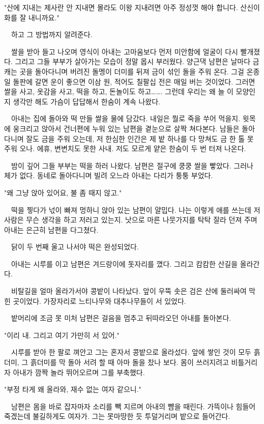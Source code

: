 \documentclass[fs9,seriesRus]{korfarm-base}
\begin{document}
{"산에 지내는 제사란 안 지내면 몰라도 이왕 지내려면 아주 정성껏 해야 합니다. 산신이 화를 잘 내니까요."

　하고 그 방법까지 알려준다.

　쌀을 받아 들고 나오며 영식이 아내는 고마움보다 먼저 미안함에 얼굴이 다시 빨개졌다. 그리고 그들 부부가 살아가는 모습이 정말 몹시 부러웠다. 양근댁 남편은 날마다 금 캐는 곳을 돌아다니며 버려진 돌멩이 더미를 뒤져 금이 섞인 돌을 주워 온다. 그걸 온종일 돌판에 갈면 운이 좋으면 이삼 원, 적어도 칠팔십 전은 매일 버는 것이었다. 그러면 쌀을 사고, 옷감을 사고, 떡을 하고, 돈놀이도 하고……. 그런데 우리는 왜 늘 이 모양인지 생각만 해도 가슴이 답답해서 한숨이 계속 나왔다.

　아내는 집에 돌아와 떡 만들 쌀을 물에 담갔다. 내일은 뭘로 죽을 쑤어 먹을지. 윗목에 웅크리고 앉아서 건너편에 누워 있는 남편을 곁눈으로 살짝 쳐다본다. 남들은 돌아다니며 잘도 금을 주워 오는데, 저 한심한 인간은 제 밭 하나를 다 망쳐도 금 한 톨 못 주워 오나. 에휴, 변변치도 못한 사내. 저도 모르게 얕은 한숨이 두 번 터져 나온다.

　밤이 깊어 그들 부부는 떡을 하러 나왔다. 남편은 절구에 쿵쿵 쌀을 빻았다. 그러나 체가 없다. 동네로 돌아다니며 빌려 오느라 아내는 다리가 퉁퉁 부었다.

"왜 그냥 앉아 있어요, 불 좀 때지 않고."

　떡을 찧다가 넋이 빠져 멍하니 앉아 있는 남편이 얄밉다. 나는 이렇게 애를 쓰는데 저 사람은 무슨 생각을 하고 저러고 있는지. 낫으로 마른 나뭇가지를 탁탁 잘라 던져 주며 아내는 은근히 남편을 다그쳤다.

　닭이 두 번째 울고 나서야 떡은 완성되었다.

　아내는 시루를 이고 남편은 겨드랑이에 돗자리를 꼈다. 그리고 캄캄한 산길을 올라간다.

　비탈길을 얼마 올라가서야 콩밭이 나타났다. 앞이 우뚝 솟은 검은 산에 둘러싸여 막힌 곳이었다. 가장자리로 느티나무와 대추나무들이 서 있었다.

　밭머리에 조금 못 미처 남편은 걸음을 멈추고 뒤따라오던 아내를 돌아본다.

"이리 내. 그리고 여기 가만히 서 있어."

　시루를 받아 한 팔로 껴안고 그는 혼자서 콩밭으로 올라섰다. 앞에 쌓인 것이 모두 흙더미, 그 흙더미를 막 돌아 서려 할 때 아마 돌을 찼나 보다. 몸이 쓰러지려고 비틀거리자 아내가 깜짝 놀라 뛰어오르며 그를 부축했다.

"부정 타게 왜 올라와, 재수 없는 여자 같으니."

　남편은 몸을 바로 잡자마자 소리를 빽 지르며 아내의 뺨을 때린다. 가뜩이나 힘들어 죽겠는데 불길하게도 여자가. 그는 못마땅한 듯 투덜거리며 밭으로 들어간다.

}
\end{document}
